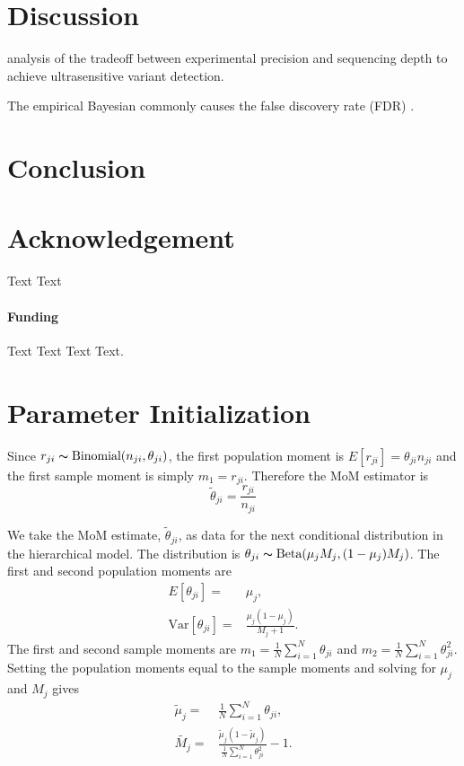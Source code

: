 \documentclass{bioinfo}
\begin{document}
\section{Discussion}
analysis of the tradeoff between experimental precision and sequencing depth to achieve ultrasensitive variant detection.

The empirical Bayesian commonly causes the false discovery rate (FDR) \citep{efron2010large}.


\section{Conclusion}



\section*{Acknowledgement}
Text Text

\paragraph{Funding\textcolon} Text Text  Text Text.


%
%
%
%
%




\appendix

\section{Parameter Initialization}\label{sec:appendix_mom}
Since $r_{ji} \thicksim \text{Binomial}(n_{ji}, \theta_{ji})$, the first population moment is  $E[r_{ji}] = \theta_{ji} n_{ji}$ and the first sample moment is simply $m_1 = r_{ji}$.
Therefore the MoM estimator is
\begin{equation}
	\tilde{\theta}_{ji} = \frac{r_{ji}} {n_{ji}}
\end{equation}

We take the MoM estimate, $\tilde{\theta}_{ji}$, as data for the next conditional distribution in the hierarchical model.
The distribution is $\theta_{ji} \thicksim \text{Beta}(\mu_jM_j, (1-\mu_j)M_j)$. The first and second population moments are
\begin{eqnarray}
	E[\theta_{ji}] =& \mu_j,\\
	\text{Var}[\theta_{ji}] =& \frac{\mu_j(1-\mu_j)} { M_j + 1 }.
\end{eqnarray}
The first and second sample moments are $m_1 = \frac{1}{N}\sum_{i=1}^N \theta_{ji}$ and $m_2 = \frac{1}{N}\sum_{i=1}^N \theta_{ji}^2$.
Setting the population moments equal to the sample moments and solving for $\mu_j$ and $M_j$ gives
\begin{eqnarray}
	\tilde{\mu}_j =& \frac{1}{N} \sum_{i=1}^N \theta_{ji}, \\
	\tilde{M_j} =& \frac{ \tilde{\mu}_j (1 - \tilde{\mu}_j ) } { \frac{1}{N} \sum_{i=1}^N \theta_{ji}^2 } -1.
\end{eqnarray}
\end{document}
